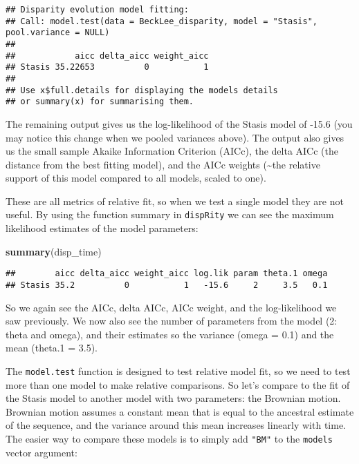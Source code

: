 \documentclass[
]{book}
\newenvironment{Shaded}{\begin{snugshade}}{\end{snugshade}}
\newcommand{\FunctionTok}[1]{\textcolor[rgb]{0.13,0.29,0.53}{\textbf{#1}}}
\newcommand{\NormalTok}[1]{#1}
\begin{document}
\begin{verbatim}
## Disparity evolution model fitting:
## Call: model.test(data = BeckLee_disparity, model = "Stasis", pool.variance = NULL) 
## 
##            aicc delta_aicc weight_aicc
## Stasis 35.22653          0           1
## 
## Use x$full.details for displaying the models details
## or summary(x) for summarising them.
\end{verbatim}

The remaining output gives us the log-likelihood of the Stasis model of -15.6 (you may notice this change when we pooled variances above).
The output also gives us the small sample Akaike Information Criterion (AICc), the delta AICc (the distance from the best fitting model), and the AICc weights (\textasciitilde the relative support of this model compared to all models, scaled to one).

These are all metrics of relative fit, so when we test a single model they are not useful.
By using the function summary in \texttt{dispRity} we can see the maximum likelihood estimates of the model parameters:

\begin{Shaded}
\begin{Highlighting}[]
\FunctionTok{summary}\NormalTok{(disp\_time)}
\end{Highlighting}
\end{Shaded}

\begin{verbatim}
##        aicc delta_aicc weight_aicc log.lik param theta.1 omega
## Stasis 35.2          0           1   -15.6     2     3.5   0.1
\end{verbatim}

So we again see the AICc, delta AICc, AICc weight, and the log-likelihood we saw previously.
We now also see the number of parameters from the model (2: theta and omega), and their estimates so the variance (omega = 0.1) and the mean (theta.1 = 3.5).

The \texttt{model.test} function is designed to test relative model fit, so we need to test more than one model to make relative comparisons.
So let's compare to the fit of the Stasis model to another model with two parameters: the Brownian motion.
Brownian motion assumes a constant mean that is equal to the ancestral estimate of the sequence, and the variance around this mean increases linearly with time.
The easier way to compare these models is to simply add \texttt{"BM"} to the \texttt{models} vector argument:
\end{document}
